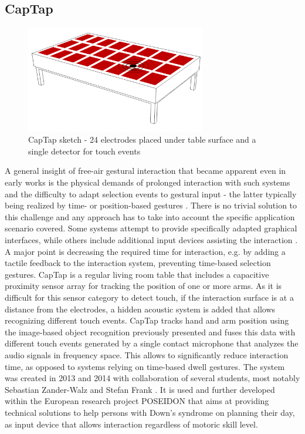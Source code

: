\subsection{CapTap}
\begin{figure}[h]
\centering
\includegraphics[width=0.7\textwidth]{images/captap_v2}
\caption{CapTap sketch - 24 electrodes placed under table surface and a single detector for touch events}
\label{fig:captap_sketch}
\end{figure}
A general insight of free-air gestural interaction that became apparent even in early works is the physical demands of prolonged interaction with such systems \cite{Baudel1993, lenman2002} and the difficulty to adapt selection events to gestural input - the latter typically being realized by time- or position-based gestures \cite{Baudel1993,Krum2002}. There is no trivial solution to this challenge and any approach has to take into account the specific application scenario covered. Some systems attempt to provide specifically adapted graphical interfaces, while others include additional input devices assisting the interaction \cite{Wu2003,zimmerman1987hand}. A major point is decreasing the required time for interaction, e.g. by adding a tactile feedback to the interaction system, preventing time-based selection gestures. CapTap is a regular living room table that includes a capacitive proximity sensor array for tracking the position of one or more arms. As it is difficult for this sensor category to detect touch, if the interaction surface is at a distance from the electrodes, a hidden acoustic system is added that allows recognizing different touch events. CapTap tracks hand and arm position using the image-based object recognition previously presented and fuses this data with different touch events generated by a single contact microphone that analyzes the audio signals in frequency space. This allows to significantly reduce interaction time, as opposed to systems relying on time-based dwell gestures. The system was created in 2013 and 2014 with collaboration of several students, most notably Sebastian Zander-Walz and Stefan Frank \cite{Braun2013captap}. It is used and further developed within the European research project POSEIDON that aims at providing technical solutions to help persons with Down's syndrome on planning their day, as input device that allows interaction regardless of motoric skill level.
